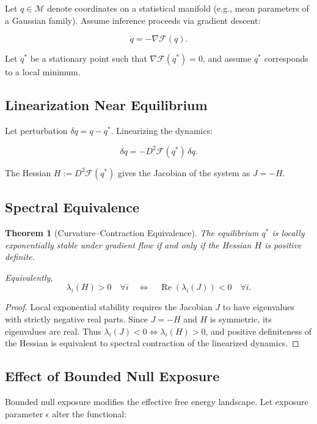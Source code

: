 \documentclass[11pt]{article}
\newtheorem{theorem}{Theorem}
\theoremstyle{remark}
\begin{document}
Let $q \in \mathcal{M}$ denote coordinates on a statistical manifold (e.g., mean parameters of a Gaussian family). Assume inference proceeds via gradient descent:

\[
\dot{q} = - \nabla \mathcal{F}(q).
\]

Let $q^*$ be a stationary point such that $\nabla \mathcal{F}(q^*) = 0$, and assume $q^*$ corresponds to a local minimum.

\subsection{Linearization Near Equilibrium}

Let perturbation $\delta q = q - q^*$. Linearizing the dynamics:

\[
\dot{\delta q}
=
- D^2 \mathcal{F}(q^*) \, \delta q.
\]

The Hessian $H := D^2 \mathcal{F}(q^*)$ gives the Jacobian of the system as $J = -H$.

\subsection{Spectral Equivalence}

\begin{theorem}[Curvature--Contraction Equivalence]
\label{thm:curvature_contraction}
The equilibrium $q^*$ is locally exponentially stable under gradient flow if and only if the Hessian $H$ is positive definite.

Equivalently,
\[
\lambda_i(H) > 0
\quad \forall i
\quad \Longleftrightarrow \quad
\operatorname{Re}(\lambda_i(J)) < 0 \quad \forall i.
\]
\end{theorem}

\begin{proof}
Local exponential stability requires the Jacobian $J$ to have eigenvalues with strictly negative real parts. Since $J = -H$ and $H$ is symmetric, its eigenvalues are real. Thus $\lambda_i(J) < 0 \iff \lambda_i(H) > 0$, and positive definiteness of the Hessian is equivalent to spectral contraction of the linearized dynamics.
\end{proof}

\subsection{Effect of Bounded Null Exposure}

Bounded null exposure modifies the effective free energy landscape. Let exposure parameter $\epsilon$ alter the functional:
\end{document}
